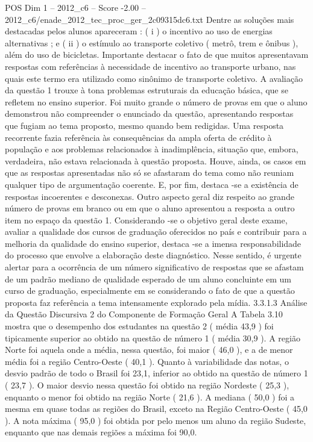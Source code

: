 \begin{textsample}{POS Dim 1 – 2012\_c6 – Score -2.00 – 2012\_c6/enade\_2012\_tec\_proc\_ger\_2c09315dc6.txt}
Dentre as soluções mais destacadas pelos alunos apareceram : ( i ) o incentivo ao uso de energias alternativas ; e ( ii ) o estímulo ao transporte coletivo ( metrô, trem e ônibus ), além do uso de bicicletas.
Importante destacar o fato de que muitos apresentavam respostas com referências à necessidade de incentivo ao transporte urbano, nas quais este termo era utilizado como sinônimo de transporte coletivo.
A avaliação da questão 1 trouxe à tona problemas estruturais da educação básica, que se refletem no ensino superior.
Foi muito grande o número de provas em que o aluno demonstrou não compreender o enunciado da questão, apresentando respostas que fugiam ao tema proposto, mesmo quando bem redigidas.
Uma resposta recorrente fazia referência às consequências da ampla oferta de crédito à população e aos problemas relacionados à inadimplência, situação que, embora, verdadeira, não estava relacionada à questão proposta.
Houve, ainda, os casos em que as respostas apresentadas não só se afastaram do tema como não reuniam qualquer tipo de argumentação coerente.
E, por fim, destaca -se a existência de respostas incoerentes e desconexas.
Outro aspecto geral diz respeito ao grande número de provas em branco ou em que o aluno apresentou a resposta a outro item no espaço da questão 1.
Considerando -se o objetivo geral deste exame, avaliar a qualidade dos cursos de graduação oferecidos no país e contribuir para a melhoria da qualidade do ensino superior, destaca -se a imensa responsabilidade do processo que envolve a elaboração deste diagnóstico.
Nesse sentido, é urgente alertar para a ocorrência de um número significativo de respostas que se afastam de um padrão mediano de qualidade esperado de um aluno concluinte em um curso de graduação, especialmente em se considerando o fato de que a questão proposta faz referência a tema intensamente explorado pela mídia. 3.3.1.3 Análise da Questão Discursiva 2 do Componente de Formação Geral A Tabela 3.10 mostra que o desempenho dos estudantes na questão 2 ( média 43,9 ) foi tipicamente superior ao obtido na questão de número 1 ( média 30,9 ).
A região Norte foi aquela onde a média, nessa questão, foi maior ( 46,0 ), e a de menor média foi a região Centro-Oeste ( 40,1 ).
Quanto à variabilidade das notas, o desvio padrão de todo o Brasil foi 23,1, inferior ao obtido na questão de número 1 ( 23,7 ).
O maior desvio nessa questão foi obtido na região Nordeste ( 25,3 ), enquanto o menor foi obtido na região Norte ( 21,6 ).
A mediana ( 50,0 ) foi a mesma em quase todas as regiões do Brasil, exceto na Região Centro-Oeste ( 45,0 ).
A nota máxima ( 95,0 ) foi obtida por pelo menos um aluno da região Sudeste, enquanto que nas demais regiões a máxima foi 90,0.

\end{textsample}
